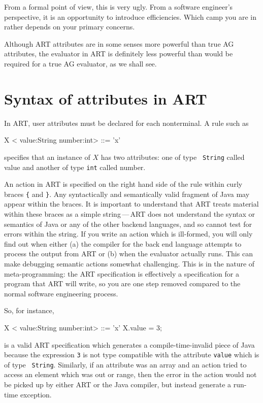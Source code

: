 From a formal point of view, this is very ugly. From a software
engineer's perspective, it is an opportunity to introduce
efficiencies. Which camp you are in rather depends on your primary
concerns.

Although ART attributes are in some senses more powerful than true AG
attributes, the evaluator in ART is definitely less powerful than would
be required for a true AG evaluator, as we shall see.

\section{Syntax of attributes in ART}
In ART, user attributes must be declared for each nonterminal. A rule such as
\begin{bnfblock}
X < value:String number:int> ::= 'x'
\end{bnfblock}
specifies that an instance of $X$ has two attributes: one of type {\tt
  String} called value and another of type {\tt int} called number.

An action in ART is specified on the right hand side of the rule
within curly braces \verb+{+ and \verb+}+. Any syntactically and
semantically valid fragment of Java may appear within the braces.  It
is important to understand that ART treats material within these
braces as a simple string\,---\,ART does not understand the syntax or
semantics of Java or any of the other backend languages, and so cannot
test for errors within the string. If you write an action which is ill-formed, 
you will only find out when either (a) the compiler for the
back end language attempts to process the output from ART or (b) when
the evaluator actually runs. This can make debugging semantic actions
somewhat challenging. This is in the nature of meta-programming: the
ART specification is effectively a specification for a program that
ART will write, so you are one step removed compared to the normal
software engineering process.

So, for instance,
\begin{bnfblock}
X < value:String number:int> ::= 'x' { X.value = 3; }
\end{bnfblock}
is a valid ART specification which generates a compile-time-invalid
piece of Java because the expression {\tt 3} is not type compatible
with the attribute {\tt value} which is of type {\tt
  String}. Similarly, if an attribute was an array and an action tried
to access an element which was out or range, then the error in the
action would not be picked up by either ART or the Java compiler, but
instead generate a run-time exception.

